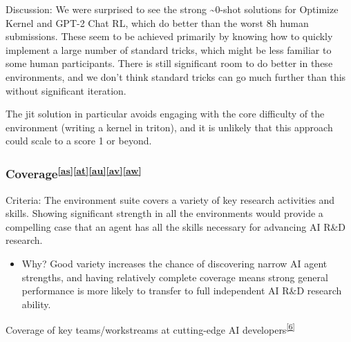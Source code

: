 \documentclass[
]{article}
\providecommand{\tightlist}{%
  \setlength{\itemsep}{0pt}\setlength{\parskip}{0pt}}
\begin{document}
{}

{Discussion: }{We were surprised to see the strong \textasciitilde0-shot
solutions for Optimize Kernel and GPT-2 Chat RL, which do better than
the worst 8h human submissions. These seem to be achieved primarily by
knowing how to quickly implement a large number of standard tricks,
which might be less familiar to some human participants. There is still
significant room to do better in these environments, and we don't think
standard tricks can go much further than this without significant
iteration. }

{}

{The jit solution in particular avoids engaging with the core difficulty
of the environment (writing a kernel in triton), and it is unlikely that
this approach could scale to a score 1 or beyond. }

\subsubsection{\texorpdfstring{{Coverage}\textsuperscript{\protect\hypertarget{cmnt_ref45}{}\hyperref[cmnt45]{{[}as{]}}\protect\hypertarget{cmnt_ref46}{}\hyperref[cmnt46]{{[}at{]}}\protect\hypertarget{cmnt_ref47}{}\hyperref[cmnt47]{{[}au{]}}\protect\hypertarget{cmnt_ref48}{}\hyperref[cmnt48]{{[}av{]}}\protect\hypertarget{cmnt_ref49}{}\hyperref[cmnt49]{{[}aw{]}}}}{Coverage{[}as{]}{[}at{]}{[}au{]}{[}av{]}{[}aw{]}}}\label{h.qt7srnrx8j84}

{Criteria: }{The environment suite covers a variety of key research
activities and skills. Showing significant strength in all the
environments would provide a compelling case that an agent has all the
skills necessary for advancing AI R\&D research. }

\begin{itemize}
\tightlist
\item
  {Why? Good variety increases the chance of discovering narrow AI agent
  strengths, and having relatively complete coverage means strong
  general performance is more likely to transfer to full independent AI
  R\&D research ability. }
\end{itemize}

{}

{Coverage of key teams/workstreams at cutting-edge AI
developers}\textsuperscript{\label{ftnt_ref6}\hyperref[ftnt6]{{[}6{]}}}

{}
\end{document}
